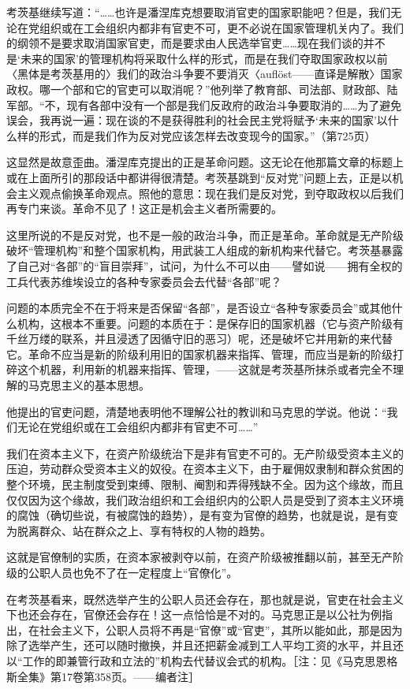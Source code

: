 \documentclass[UTF8, 12pt, a4paper]{ctexrep}
\begin{document}
考茨基继续写道：“……也许是潘涅库克想要取消官吏的国家职能吧？但是，我们无论在党组织或在工会组织内都非有官吏不可，更不必说在国家管理机关内了。我们的纲领不是要求取消国家官吏，而是要求由人民选举官吏……现在我们谈的并不是‘未来的国家’的管理机构将采取什么样的形式，而是在我们夺取国家政权以前〈黑体是考茨基用的〉我们的政治斗争要不要消灭〈auflöst——直译是解散〉国家政权。哪一个部和它的官吏可以取消呢？”他列举了教育部、司法部、财政部、陆军部。“不，现有各部中没有一个部是我们反政府的政治斗争要取消的……为了避免误会，我再说一遍：现在谈的不是获得胜利的社会民主党将赋予‘未来的国家’以什么样的形式，而是我们作为反对党应该怎样去改变现今的国家。”（第725页）

这显然是故意歪曲。潘涅库克提出的正是革命问题。这无论在他那篇文章的标题上或在上面所引的那段话中都讲得很清楚。考茨基跳到“反对党”问题上去，正是以机会主义观点偷换革命观点。照他的意思：现在我们是反对党，到夺取政权以后我们再专门来谈。革命不见了！这正是机会主义者所需要的。

这里所说的不是反对党，也不是一般的政治斗争，而正是革命。革命就是无产阶级破坏“管理机构”和整个国家机构，用武装工人组成的新机构来代替它。考茨基暴露了自己对“各部”的“盲目崇拜”，试问，为什么不可以由——譬如说——拥有全权的工兵代表苏维埃设立的各种专家委员会去代替“各部”呢？

问题的本质完全不在于将来是否保留“各部”，是否设立“各种专家委员会”或其他什么机构，这根本不重要。问题的本质在于：是保存旧的国家机器（它与资产阶级有千丝万缕的联系，并且浸透了因循守旧的恶习）呢，还是破坏它并用新的来代替它。革命不应当是新的阶级利用旧的国家机器来指挥、管理，而应当是新的阶级打碎这个机器，利用新的机器来指挥、管理，——这就是考茨基所抹杀或者完全不理解的马克思主义的基本思想。

他提出的官吏问题，清楚地表明他不理解公社的教训和马克思的学说。他说：“我们无论在党组织或在工会组织内都非有官吏不可……”

我们在资本主义下，在资产阶级统治下是非有官吏不可的。无产阶级受资本主义的压迫，劳动群众受资本主义的奴役。在资本主义下，由于雇佣奴隶制和群众贫困的整个环境，民主制度受到束缚、限制、阉割和弄得残缺不全。因为这个缘故，而且仅仅因为这个缘故，我们政治组织和工会组织内的公职人员是受到了资本主义环境的腐蚀（确切些说，有被腐蚀的趋势），是有变为官僚的趋势，也就是说，是有变为脱离群众、站在群众之上、享有特权的人物的趋势。

这就是官僚制的实质，在资本家被剥夺以前，在资产阶级被推翻以前，甚至无产阶级的公职人员也免不了在一定程度上“官僚化”。

在考茨基看来，既然选举产生的公职人员还会存在，那也就是说，官吏在社会主义下也还会存在，官僚还会存在！这一点恰恰是不对的。马克思正是以公社为例指出，在社会主义下，公职人员将不再是“官僚”或“官吏”，其所以能如此，那是因为除了选举产生，还可以随时撤换，并且还把薪金减到工人平均工资的水平，并且还以“工作的即兼管行政和立法的”机构去代替议会式的机构。［注：见《马克思恩格斯全集》第17卷第358页。——编者注］
\end{document}
